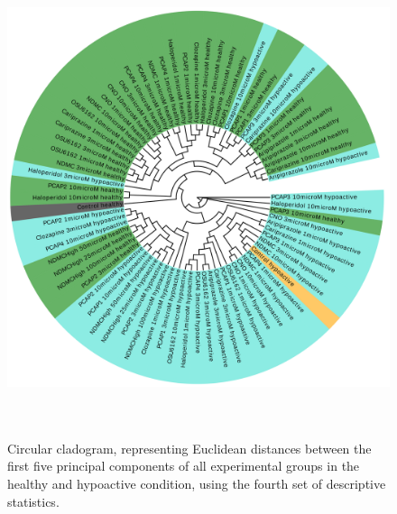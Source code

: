 \documentclass[a4paper,12pt]{article}
\begin{document}
\begin{figure}[h!]
\begin{center}
\includegraphics[width=14cm,height=14cm]{DarkApoLow_set4_PCA_tree_A.png}
\caption{Circular cladogram, representing Euclidean distances between the first five principal components of all experimental groups in the healthy and hypoactive condition, using the fourth set of descriptive statistics.}
\end{center}
\end{figure}
\newpage
\end{document}
